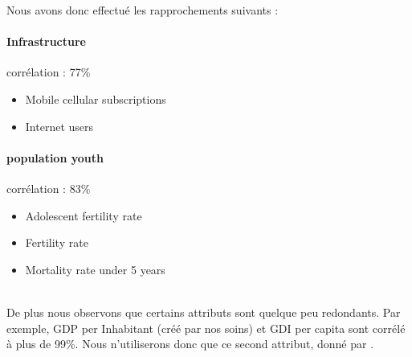 Nous avons donc effectué les rapprochements suivants : 
\paragraph{Infrastructure} corrélation : 77\%
		\begin{itemize}
			\item Mobile cellular subscriptions
			\item Internet users
		\end{itemize}
\paragraph{population youth} corrélation : 83\%
		\begin{itemize}
			\item Adolescent fertility rate
			\item Fertility rate
			\item Mortality rate under 5 years
		\end{itemize}
\hfill\\

De plus nous observons que certains attributs sont quelque peu redondants. Par exemple, GDP per Inhabitant (créé par nos soins) et GDI per capita sont corrélé à plus de 99\%. Nous n'utiliserons donc que ce second attribut, donné par \lesite .



